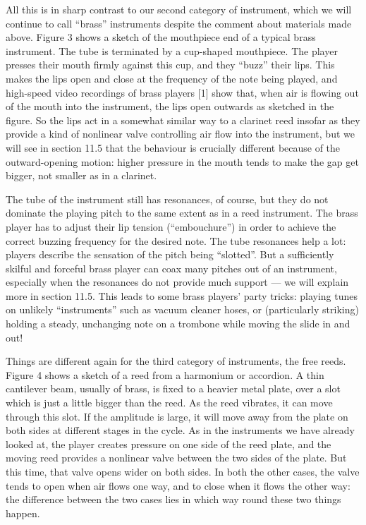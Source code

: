   All this is in sharp contrast to our second category of instrument, which we 
  will continue to call “brass” instruments despite the comment about materials 
  made above. Figure 3 shows a sketch of the mouthpiece end of a typical brass 
  instrument. The tube is terminated by a cup-shaped mouthpiece. The player 
  presses their mouth firmly against this cup, and they “buzz” their lips. This 
  makes the lips open and close at the frequency of the note being played, and 
  high-speed video recordings of brass players [1] show that, when air is 
  flowing out of the mouth into the instrument, the lips open outwards as 
  sketched in the figure. So the lips act in a somewhat similar way to a 
  clarinet reed insofar as they provide a kind of nonlinear valve controlling 
  air flow into the instrument, but we will see in section 11.5 that the 
  behaviour is crucially different because of the outward-opening motion: 
  higher pressure in the mouth tends to make the gap get bigger, not smaller as 
  in a clarinet. 


  The tube of the instrument still has resonances, of course, but they do not 
  dominate the playing pitch to the same extent as in a reed instrument. The 
  brass player has to adjust their lip tension (“embouchure”) in order to 
  achieve the correct buzzing frequency for the desired note. The tube 
  resonances help a lot: players describe the sensation of the pitch being 
  “slotted”. But a sufficiently skilful and forceful brass player can coax many 
  pitches out of an instrument, especially when the resonances do not provide 
  much support — we will explain more in section 11.5. This leads to some brass 
  players’ party tricks: playing tunes on unlikely “instruments” such as vacuum 
  cleaner hoses, or (particularly striking) holding a steady, unchanging note 
  on a trombone while moving the slide in and out! 

  Things are different again for the third category of instruments, the free 
  reeds. Figure 4 shows a sketch of a reed from a harmonium or accordion. A 
  thin cantilever beam, usually of brass, is fixed to a heavier metal plate, 
  over a slot which is just a little bigger than the reed. As the reed 
  vibrates, it can move through this slot. If the amplitude is large, it will 
  move away from the plate on both sides at different stages in the cycle. As 
  in the instruments we have already looked at, the player creates pressure on 
  one side of the reed plate, and the moving reed provides a nonlinear valve 
  between the two sides of the plate. But this time, that valve opens wider on 
  both sides. In both the other cases, the valve tends to open when air flows 
  one way, and to close when it flows the other way: the difference between the 
  two cases lies in which way round these two things happen. 

